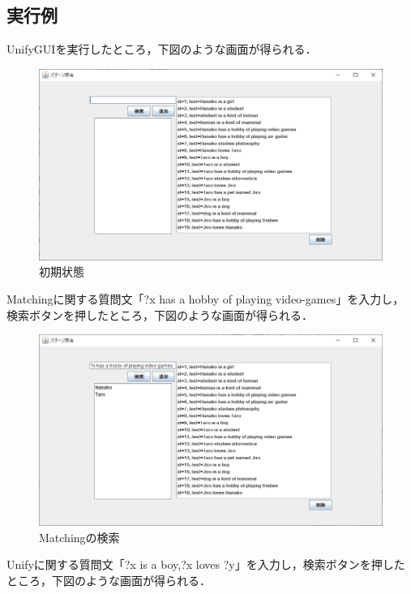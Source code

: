 \documentclass[12pt]{jarticle}
\begin{document}
\clearpage
\subsection{実行例}
UnifyGUIを実行したところ，下図のような画面が得られる．

\begin{figure}[!hbt]
  	\begin{center}
  		\includegraphics[scale=0.60]{images/scs2-3-1.png}
	\end{center}
  	\caption{初期状態}
\end{figure}
\clearpage

Matchingに関する質問文「?x has a hobby of playing video-games」を入力し，検索ボタンを押したところ，下図のような画面が得られる．

\begin{figure}[!hbt]
  	\begin{center}
  		\includegraphics[scale=0.60]{images/scs2-3-2.png}
	\end{center}
  	\caption{Matchingの検索}
\end{figure}
\clearpage

Unifyに関する質問文「?x is a boy,?x loves ?y」を入力し，検索ボタンを押したところ，下図のような画面が得られる．
\end{document}
